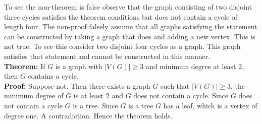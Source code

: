 \begin{enumerate}
    
    \newpage
     To see the non-theorem is false observe that the graph consisting of two disjoint three cycles satisfies the theorem conditions but does not contain a cycle of length four. The non-proof falsely assume that all graphs satisfying the statement can be constructed by taking a graph that does and adding a new vertex. This is not true. To see this consider two disjoint four cycles as a graph. This graph satisfies that statement and cannot be constructed in this manner.
    \\
    \textbf{Theorem:} If $G$ is a graph with $|V(G)|\geq 3$ and minimum degree at least $2$, then $G$ contains a cycle. 
    \\
    \textbf{Proof:} Suppose not. Then there exists a graph $G$ such that $|V(G)|\geq 3$, the minimum degree of $G$ is at least $2$ and $G$ does not contain a cycle. Since $G$ does not contain a cycle $G$ is a tree. Since $G$ is a tree $G$ has a leaf, which is a vertex of degree one. A contradiction. Hence the theorem holds. 


\end{enumerate}
